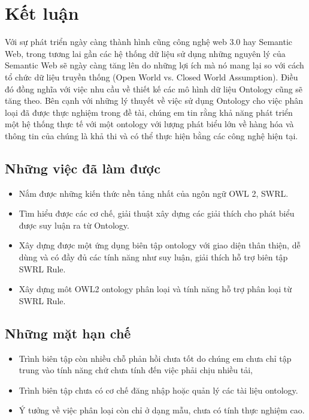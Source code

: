 \chapter{Kết luận}
Với sự phát triển ngày càng thành hình cũng công nghệ web 3.0 hay Semantic Web, trong tương lai gần các hệ thống dữ liệu sử dụng những nguyên lý của Semantic Web sẽ ngày càng tăng lên do những lợi ích mà nó mang lại so với cách tổ chức dữ liệu truyền thống (Open World vs. Closed World Assumption). Điều đó đồng nghĩa với việc nhu cầu về thiết kế các mô hình dữ liệu Ontology cũng sẽ tăng theo. Bên cạnh với những lý thuyết về việc sử dụng Ontology cho việc phân loại đã được thực nghiệm trong đề tài, chúng em tin rằng khả năng phát triển một hệ thống thực tế với một ontology với lượng phát biểu lớn về hàng hóa và thông tin của chúng là khả thi và có thể thực hiện bằng các công nghệ hiện tại.
\section{Những việc đã làm được}
\begin{itemize}
\item Nắm được những kiến thức nền tảng nhất của ngôn ngữ OWL 2, SWRL.
\item Tìm hiểu được các cơ chế, giải thuật xây dựng các giải thích cho phát biểu được suy luận ra từ Ontology.
\item Xây dựng được một ứng dụng biên tập ontology với giao diện thân thiện, dễ dùng và có đầy đủ các tính năng như suy luận, giải thích hỗ trợ biên tập SWRL Rule.
\item Xây dựng môt OWL2 ontology phân loại và tính năng hỗ trợ phân loại từ SWRL Rule.
\end{itemize}
\section{Những mặt hạn chế}
\begin{itemize}
\item Trình biên tập còn nhiều chỗ phản hồi chưa tốt do chúng em chưa chỉ tập trung vào tính năng chứ chưa tính đến việc phải chịu nhiều tải,
\item Trình biên tập chưa có cơ chế đăng nhập hoặc quản lý các tài liệu ontology.
\item Ý tưởng về việc phân loại còn chỉ ở dạng mẫu, chưa có tính thực nghiệm cao.
\end{itemize}
